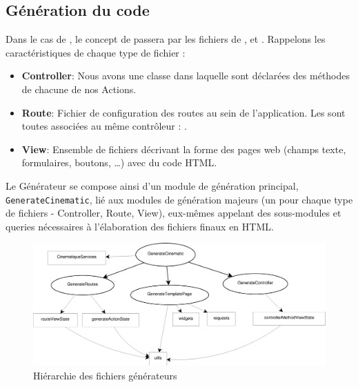 \subsection{Génération du code}
Dans le cas de \kwplay, le concept de \kwcinematic passera par les fichiers de ,  et . Rappelons les caractéristiques de chaque type de fichier :
\begin{itemize}
\item \textbf{Controller}: Nous avons une classe  dans laquelle sont déclarées des méthodes de chacune de nos Actions.
\item \textbf{Route}: Fichier de configuration des routes au sein de l'application. Les  sont toutes associées au même contrôleur : . 
\item \textbf{View}: Ensemble de fichiers décrivant la forme des pages web (champs texte, formulaires, boutons, \dots) avec du code HTML.
\end{itemize}
Le Générateur \guim{\kwcinematic{}} se compose ainsi d'un module de génération principal, \verb+GenerateCinematic+, lié aux modules de génération majeurs (un pour chaque type de fichiers - Controller, Route, View), eux-mêmes appelant des sous-modules et queries nécessaires à l'élaboration des fichiers finaux en HTML.
\begin{figure}[h]
  \centering
  \includegraphics[scale=.35]{img/hierarchie.eps}
  \caption{Hiérarchie des fichiers générateurs}
  \label{fig:gen}
\end{figure}


